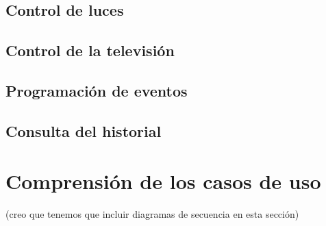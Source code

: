 \subsection{Control de luces}
\subsection{Control de la televisi\'on}
\subsection{Programaci\'on de eventos}
\subsection{Consulta del historial}
\section{Comprensi\'on de los casos de uso}
(creo que tenemos que incluir diagramas de secuencia en esta secci\'on)